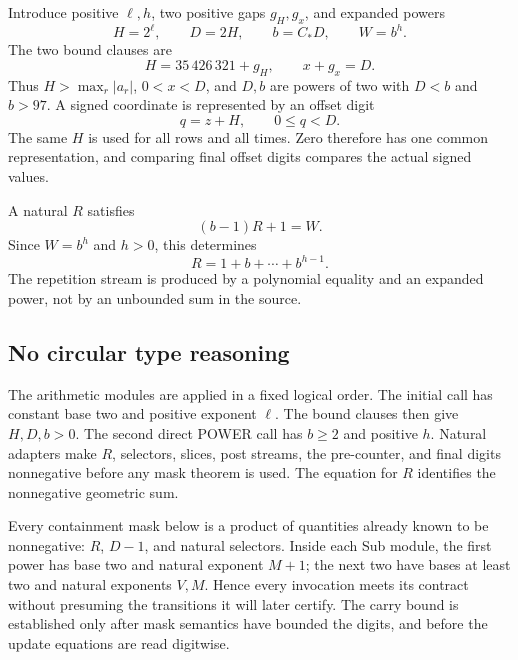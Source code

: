 \documentclass[11pt,letterpaper]{article}
\theoremstyle{definition}
\theoremstyle{remark}
\begin{document}
Introduce positive $\ell,h$, two positive gaps $g_H,g_x$, and expanded powers
\begin{equation}\label{gts:cm:eq:radices}
 H=2^\ell,\qquad D=2H,\qquad b=C_*D,\qquad W=b^h.
\end{equation}
The two bound clauses are
\begin{equation}\label{gts:cm:eq:bounds}
 H=35\,426\,321+g_H,\qquad x+g_x=D.
\end{equation}
Thus $H>\max_r|a_r|$, $0<x<D$, and $D,b$ are powers of two with $D<b$ and $b>97$. A signed coordinate is represented by an offset digit
\begin{equation}\label{gts:cm:eq:offset}
 q=z+H,\qquad 0\le q<D.
\end{equation}
The same $H$ is used for all rows and all times. Zero therefore has one common representation, and comparing final offset digits compares the actual signed values.

A natural $R$ satisfies
\begin{equation}\label{gts:cm:eq:repeat}
 (b-1)R+1=W.
\end{equation}
Since $W=b^h$ and $h>0$, this determines
\[
 R=1+b+\cdots+b^{h-1}.
\]
The repetition stream is produced by a polynomial equality and an expanded power, not by an unbounded sum in the source.

\subsection{No circular type reasoning}
The arithmetic modules are applied in a fixed logical order. The initial call has constant base two and positive exponent $\ell$. The bound clauses then give $H,D,b>0$. The second direct POWER call has $b\ge2$ and positive $h$. Natural adapters make $R$, selectors, slices, post streams, the pre-counter, and final digits nonnegative before any mask theorem is used. The equation for $R$ identifies the nonnegative geometric sum.

Every containment mask below is a product of quantities already known to be nonnegative: $R$, $D-1$, and natural selectors. Inside each Sub module, the first power has base two and natural exponent $M+1$; the next two have bases at least two and natural exponents $V,M$. Hence every invocation meets its contract without presuming the transitions it will later certify. The carry bound is established only after mask semantics have bounded the digits, and before the update equations are read digitwise.
\end{document}
